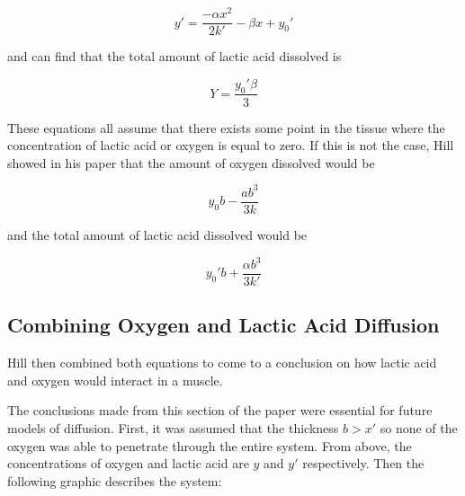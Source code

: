 \documentclass{article}
\begin{document}
\begin{equation}
    y' = \frac{-\alpha x^2}{2k'} - \beta x + y_0'    
\end{equation}

and can find that the total amount of lactic acid dissolved is

\begin{equation}
    Y = \frac{y_0' \beta}{3}
\end{equation}

These equations all assume that there exists some point in the tissue where the concentration of lactic acid or oxygen
is equal to zero. If this is not the case, Hill showed in his paper that the amount of oxygen dissolved would be

\begin{equation}
    y_0b - \frac{ab^3}{3k}
\end{equation}

and the total amount of lactic acid dissolved would be 

\begin{equation}
    y_0'b + \frac{\alpha b^3}{3k'}
\end{equation}

\subsection{Combining Oxygen and Lactic Acid Diffusion}

Hill then combined both equations to come to a conclusion on how lactic acid and oxygen would interact in a muscle.

The conclusions made from this section of the paper were essential for future models of diffusion. First, it was
assumed that the thickness $b > x'$ so none of the oxygen was able to penetrate through the entire system. From above,
the concentrations of oxygen and lactic acid are $y$ and $y'$ respectively. Then the following graphic describes the system:
\end{document}
